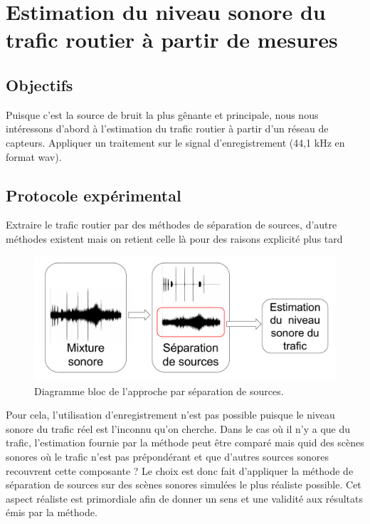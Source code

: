 \section{Estimation du niveau sonore du trafic routier à partir de mesures}

\subsection{Objectifs}
Puisque c'est la source de bruit la plus gênante et principale, nous nous intéressons d'abord à l'estimation du trafic routier à partir d'un réseau de capteurs.
Appliquer un traitement sur le signal d'enregistrement (44,1 kHz en format wav).

\subsection{Protocole expérimental}

Extraire le trafic routier par des méthodes de séparation de sources, d'autre méthodes existent mais on retient celle là pour des raisons explicité plus tard

\begin{figure}[t]
\centering
\includegraphics[width=0.7\linewidth]{./figures/NMF/bloc_diagram_source_separation.pdf}
\caption{Diagramme bloc de l'approche par séparation de sources.}
\end{figure}


Pour cela, l'utilisation d'enregistrement n'est pas possible puisque le niveau sonore du trafic réel est l'inconnu qu'on cherche. Dans le cas où il n'y a que du trafic, l'estimation fournie par la méthode peut être comparé mais quid des scènes sonores où le trafic n'est pas prépondérant et que d'autres sources sonores recouvrent cette composante ?
Le choix est donc fait d'appliquer la méthode de séparation de sources sur des scènes sonores simulées le plus réaliste possible. Cet aspect réaliste est primordiale afin de donner un sens et une validité aux résultats émis par la méthode.\\


